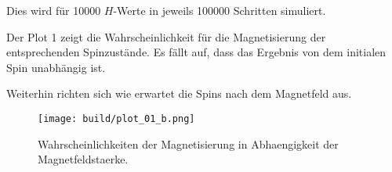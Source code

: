 \documentclass{scrartcl}
\begin{document}
Dies wird für 10000 $H$-Werte in jeweils 100000 Schritten simuliert.

Der Plot 1 zeigt die Wahrscheinlichkeit für die Magnetisierung der entsprechenden Spinzustände.
Es fällt auf, dass das Ergebnis von dem initialen Spin unabhängig ist.

Weiterhin richten sich wie erwartet die Spins nach dem Magnetfeld aus.


\begin{figure}[ht]
  \centering
  \texttt{[image: build/plot\_01\_b.png]}
  \caption{%
    Wahrscheinlichkeiten der Magnetisierung in Abhaengigkeit der Magnetfeldstaerke.%
  }%
  \label{fig:plot_01_b}
\end{figure}
\end{document}
